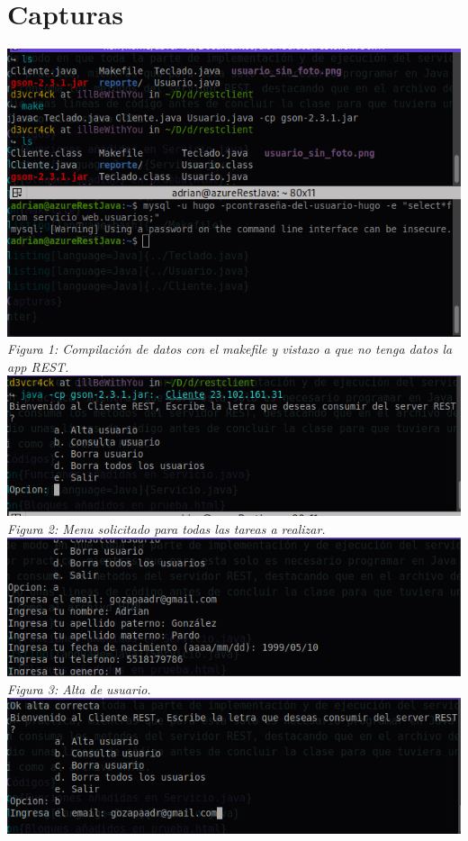 \documentclass[10pt,executivepaper]{article}
\begin{document}
\section{Capturas}
\begin{center}
  \includegraphics[scale=0.5]{imgs/com_sin_datos.png}
  \\\textit{Figura 1: Compilación de datos con el makefile y vistazo a que no tenga datos la app REST.}\\
  \includegraphics[scale=0.5]{imgs/menu.png}\\
  \textit{Figura 2: Menu solicitado para todas las tareas a realizar.}
  \\
  \includegraphics[scale=0.5]{imgs/alta.png}\\
  \textit{Figura 3: Alta de usuario.}
  \\
  \includegraphics[scale=0.5]{imgs/alta-consulta.png}\\

\end{center}
\end{document}
